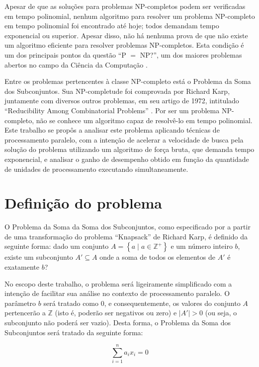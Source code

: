 \documentclass[12pt]{article}
\begin{document}
Apesar de que as soluções para problemas NP-completos podem ser verificadas em tempo polinomial, nenhum algoritmo para resolver um problema NP-completo em tempo polinomial foi encontrado até hoje; todos demandam tempo exponencial ou superior. Apesar disso, não há nenhuma prova de que não existe um algoritmo eficiente para resolver problemas NP-completos. Esta condição é um dos principais pontos da questão ``P $=$ NP?'', um dos maiores problemas abertos no campo da Ciência da Computação \cite{Sipser1996}.

Entre os problemas pertencentes à classe NP-completo está o Problema da Soma dos Subconjuntos. Sua NP-completude foi comprovada por Richard Karp, juntamente com diversos outros problemas, em seu artigo de 1972, intitulado ``Reducibility Among Combinatorial Problems'' \cite{Karp1972}. Por ser um problema NP-completo, não se conhece um algoritmo capaz de resolvê-lo em tempo polinomial. Este trabalho se propôs a analisar este problema aplicando técnicas de processamento paralelo, com a intenção de acelerar a velocidade de busca pela solução do problema utilizando um algoritmo de força bruta, que demanda tempo exponencial, e analisar o ganho de desempenho obtido em função da quantidade de unidades de processamento executando simultaneamente.

\section{Definição do problema} \label{sec:def}

O Problema da Soma da Soma dos Subconjuntos, como especificado por \cite{Garey1979} a partir de uma transformação do problema ``Knapsack'' de Richard Karp, é definido da seguinte forma: dado um conjunto $A = \left\{a \mid a \in \mathbb{Z}^{+}\right\}$ e um número inteiro $b$, existe um subconjunto $A' \subseteq A$ onde a soma de todos os elementos de $A'$ é exatamente $b$?

No escopo deste trabalho, o problema será ligeiramente simplificado com a intenção de facilitar sua análise no contexto de processamento paralelo. O parâmetro $b$ será tratado como 0, e consequentemente, os valores do conjunto $A$ pertencerão a $\mathbb{Z}$ (isto é, poderão ser negativos ou zero) e $\left | A' \right | > 0$ (ou seja, o subconjunto não poderá ser vazio). Desta forma, o Problema da Soma dos Subconjuntos será tratado da seguinte forma:

\begin{equation} \label{eq:subsetsum}
    \sum_{i = 1}^{n} a_{i} x_{i} = 0
\end{equation}
\end{document}
